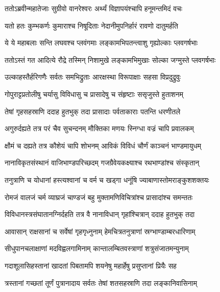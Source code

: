 
\twolineshloka
{ततोऽब्रवीन्महातेजाः सुग्रीवो वानरेश्वरः}
{अर्थ्यं विज्ञापयंश्चापि हनूमन्तमिदं वचः} %

\twolineshloka
{यतो हतः कुम्भकर्णः कुमाराश्च निषूदिताः}
{नेदानीमुपनिर्हारं रावणो दातुमर्हति} %

\twolineshloka
{ये ये महाबलाः सन्ति लघवश्च प्लवंगमाः}
{लङ्कामभिपतन्त्वाशु गृह्योल्काः प्लवगर्षभाः} %

\twolineshloka
{ततोऽस्तं गत आदित्ये रौद्रे तस्मिन् निशामुखे}
{लङ्कामभिमुखाः सोल्का जग्मुस्ते प्लवगर्षभाः} %

\twolineshloka
{उल्काहस्तैर्हरिगणैः सर्वतः समभिद्रुताः}
{आरक्षस्था विरूपाक्षाः सहसा विप्रदुद्रुवुः} %

\twolineshloka
{गोपुराट्टप्रतोलीषु चर्यासु विविधासु च}
{प्रासादेषु च संहृष्टाः ससृजुस्ते हुताशनम्} %

\twolineshloka
{तेषां गृहसहस्राणि ददाह हुतभुक् तदा}
{प्रासादाः पर्वताकाराः पतन्ति धरणीतले} %

\twolineshloka
{अगुरुर्दह्यते तत्र परं चैव सुचन्दनम्}
{मौक्तिका मणयः स्निग्धा वज्रं चापि प्रवालकम्} %

\twolineshloka
{क्षौमं च दह्यते तत्र कौशेयं चापि शोभनम्}
{आविकं विविधं चौर्णं काञ्चनं भाण्डमायुधम्} %

\twolineshloka
{नानाविकृतसंस्थानं वाजिभाण्डपरिच्छदम्}
{गजग्रैवेयकक्ष्याश्च रथभाण्डांश्च संस्कृतान्} %

\twolineshloka
{तनुत्राणि च योधानां हस्त्यश्वानां च वर्म च}
{खड्गा धनूंषि ज्याबाणास्तोमराङ्कुशशक्तयः} %

\twolineshloka
{रोमजं वालजं चर्म व्याघ्रजं चाण्डजं बहु}
{मुक्तामणिविचित्रांश्च प्रासादांश्च समन्ततः} %

\twolineshloka
{विविधानस्त्रसंघातानग्निर्दहति तत्र वै}
{नानाविधान् गृहांश्चित्रान् ददाह हुतभुक् तदा} %

\twolineshloka
{आवासान् राक्षसानां च सर्वेषां गृहगृध्नुनाम्}
{हेमचित्रतनुत्राणां स्रग्भाण्डाम्बरधारिणाम्} %

\twolineshloka
{सीधुपानचलाक्षाणां मदविह्वलगामिनाम्}
{कान्तालम्बितवस्त्राणां शत्रुसंजातमन्युनाम्} %

\twolineshloka
{गदाशूलासिहस्तानां खादतां पिबतामपि}
{शयनेषु महार्हेषु प्रसुप्तानां प्रियैः सह} %

\twolineshloka
{त्रस्तानां गच्छतां तूर्णं पुत्रानादाय सर्वतः}
{तेषां शतसहस्राणि तदा लङ्कानिवासिनाम्} %

